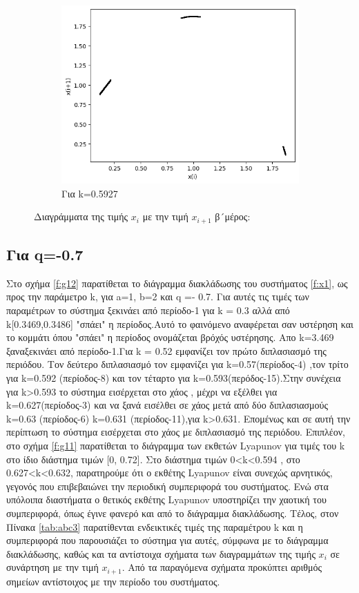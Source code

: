 \begin{figure}[h!]
\begin{subfigure}[b]{0.4\textwidth}
		\includegraphics[width=\textwidth]{LateX images/graphs q05/g11}
		\caption{Για k=0.5927}
		\label{f:36}
	\end{subfigure}
	\hfill
\caption{Διαγράμματα της τιμής \(x_i\) με την τιμή \(x_{i+1}\) β´μέρος:}		
\end{figure}

 \clearpage

\subsection{Για q=-0.7}

Στο σχήμα \ref{f:g12} παρατίθεται το διάγραμμα διακλάδωσης του συστήματος \ref{f:x1}, ως προς την παράμετρο k, για a=1, b=2 και q =- 0.7. Για αυτές τις τιμές των παραμέτρων το σύστημα ξεκινάει από περίοδο-1 για k = 0.3 αλλά από k[0.3469,0.3486] "σπάει" η περίοδος.Αυτό το φαινόμενο αναφέρεται σαν υστέρηση και το κομμάτι όπου "σπάει" η περίοδος ονομάζεται βρόχός υστέρησης. Απο k=3.469 ξαναξεκινάει από περίοδο-1.Για  k = 0.52 εμφανίζει τον πρώτο διπλασιασμό της περιόδου. Τον δεύτερο διπλασιασμό τον εμφανίζει για k=0.57(περίοδος-4) ,τον τρίτο για k=0.592 (περίοδος-8) και τον τέταρτο για k=0.593(περόδος-15).Στην συνέχεια για k>0.593 το σύστημα εισέρχεται στο χάος , μέχρι να εξέλθει  για k=0.627(περίοδος-3) και να ξανά εισέλθει σε χάος μετά από δύο διπλασιασμούς k=0.63 (περίοδος-6)  k=0.631 (περίοδος-11),για k>0.631.
Επομένως και σε αυτή την περίπτωση το σύστημα εισέρχεται στο χάος με διπλασιασμό της περιόδου. 
Επιπλέον, στο σχήμα \ref{f:g11} παρατίθεται το διάγραμμα των εκθετών Lyapunov για τιμές του k στο ίδιο διάστημα τιμών [0, 0.72].  Στο διάστημα τιμών   0<k<0.594 , στο 0.627<k<0.632, παρατηρούμε ότι ο εκθέτης Lyapunov είναι συνεχώς αρνητικός, γεγονός που επιβεβαιώνει την περιοδική συμπεριφορά του συστήματος. Ενώ στα υπόλοιπα διαστήματα ο θετικός εκθέτης Lyapunov υποστηρίζει την χαοτική του συμπεριφορά, όπως έγινε φανερό και από το διάγραμμα διακλάδωσης.
Τέλος, στον Πίνακα \ref{tab:abc3} παρατίθενται ενδεικτικές τιμές της παραμέτρου k και η συμπεριφορά που παρουσιάζει το σύστημα για αυτές, σύμφωνα με το διάγραμμα διακλάδωσης, καθώς και τα αντίστοιχα σχήματα των διαγραμμάτων της τιμής \(x_i\) σε συνάρτηση με την τιμή \(x_{i+1}\). Από τα παραγόμενα σχήματα προκύπτει αριθμός σημείων αντίστοιχος με την περίοδο του συστήματος.

